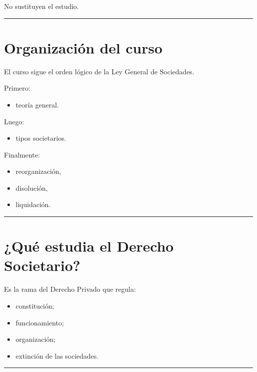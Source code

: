 \documentclass[
  spanish,
  letterpaper,
  DIV=11,
  numbers=noendperiod]{scrartcl}
\providecommand{\tightlist}{%
  \setlength{\itemsep}{0pt}\setlength{\parskip}{0pt}}
\begin{document}
No sustituyen el estudio.

\begin{center}\rule{0.5\linewidth}{0.5pt}\end{center}

\section{Organización del curso}\label{organizaciuxf3n-del-curso}

El curso sigue el orden lógico de la Ley General de Sociedades.

Primero:

\begin{itemize}
\tightlist
\item
  teoría general.
\end{itemize}

Luego:

\begin{itemize}
\tightlist
\item
  tipos societarios.
\end{itemize}

Finalmente:

\begin{itemize}
\tightlist
\item
  reorganización,
\item
  disolución,
\item
  liquidación.
\end{itemize}

\begin{center}\rule{0.5\linewidth}{0.5pt}\end{center}

\section{¿Qué estudia el Derecho
Societario?}\label{quuxe9-estudia-el-derecho-societario}

Es la rama del Derecho Privado que regula:

\begin{itemize}
\tightlist
\item
  constitución;
\item
  funcionamiento;
\item
  organización;
\item
  extinción de las sociedades.
\end{itemize}

\begin{center}\rule{0.5\linewidth}{0.5pt}\end{center}
\end{document}
